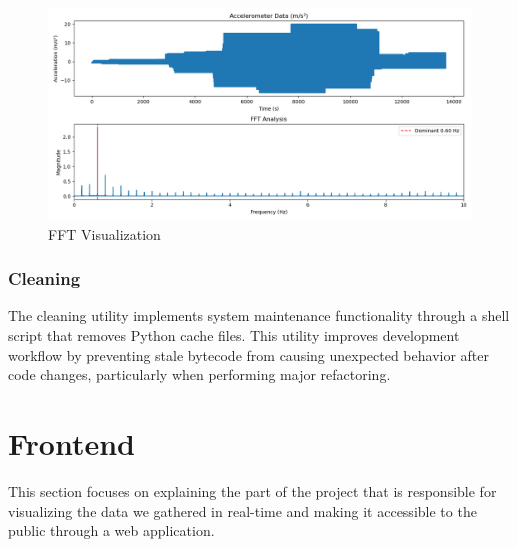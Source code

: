 \documentclass{article}
\begin{document}
    \begin{figure} [h]
        \centering
        \includegraphics[width=1\linewidth]{assets/fft_visualization.png}
        \caption{FFT Visualization}
        \label{fig:enter-label}
    \end{figure}

    \subsubsection{Cleaning}
    The cleaning utility implements system maintenance functionality through a shell script that removes Python cache files. This utility improves development workflow by preventing stale bytecode from causing unexpected behavior after code changes, particularly when performing major refactoring.

\section{Frontend}
This section focuses on explaining the part of the project that is responsible for visualizing the data we gathered in real-time and making it accessible to the public through a web application.
\end{document}
